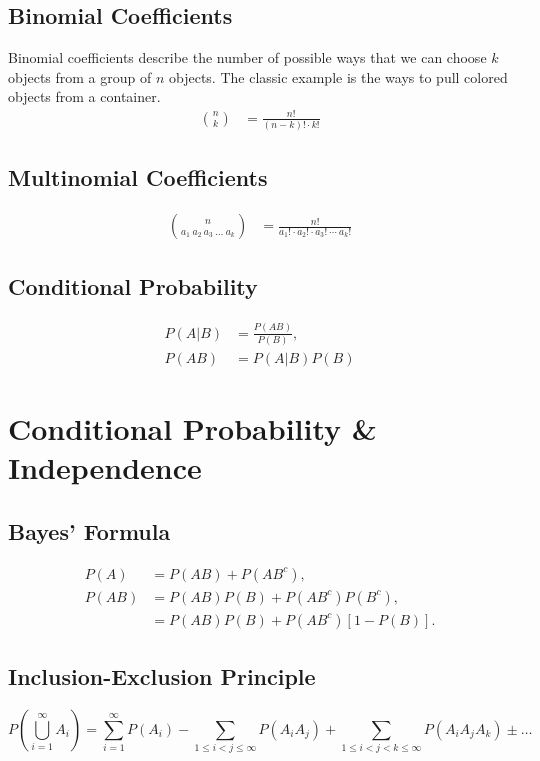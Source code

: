 \documentclass{amsproc}
\begin{document}
		\subsection{Binomial Coefficients} Binomial coefficients describe the number of possible ways that we can choose $k$ objects from a group of $n$ objects. The classic example is the ways to pull colored objects from a container.
			\begin{align*}
				\binom{n}{k} &= \frac{n!}{(n-k)! \cdot k!}
			\end{align*}

		\subsection{Multinomial Coefficients}
			\begin{align*}
				\binom{n}{a_{1} \ a_{2} \ a_{3} \ \dots \ a_{k}} &= \frac{n!}{a_{1}! \cdot a_{2}! \cdot a_{3}! \ \cdots \ a_{k}!}
			\end{align*}

		\subsection{Conditional Probability}
			\begin{align*}
				P(A|B) &= \frac{P(AB)}{P(B)}, \\
				P(AB) &= P(A|B)P(B)
			\end{align*}

	\section{Conditional Probability \& Independence}
		\subsection{Bayes' Formula}
			\begin{align*}
				P(A) &= P(AB) + P(AB^{c}), \\
				P(AB) &= P(AB)P(B) + P(AB^{c})P(B^{c}), \\
				&= P(AB)P(B) + P(AB^{c})\left[ 1 - P(B) \right].
			\end{align*}

		\subsection{Inclusion-Exclusion Principle}
			\[P\left(\bigcup\limits_{i=1}^{\infty} A_{i}\right) = \sum\limits_{i=1}^{\infty}P(A_{i}) - \sum\limits_{1 \leq i < j \leq \infty} P(A_{i}A_{j}) + \sum\limits_{1 \leq i < j < k \leq \infty} P(A_{i}A_{j}A_{k}) \pm \dots\]
\end{document}
